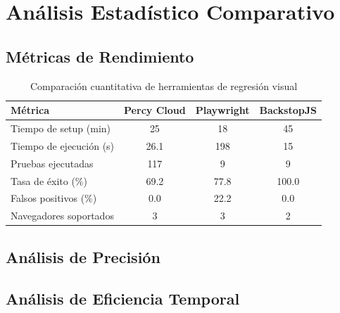 \documentclass{article}
\begin{document}
\section{Análisis Estadístico Comparativo}

\subsection{Métricas de Rendimiento}

\begin{table}[H]
\centering
\begin{tabular}{|l|c|c|c|}
\hline
\textbf{Métrica} & \textbf{Percy Cloud} & \textbf{Playwright} & \textbf{BackstopJS} \\
\hline
Tiempo de setup (min) & 25 & 18 & 45 \\
Tiempo de ejecución (s) & 26.1 & 198 & 15 \\
Pruebas ejecutadas & 117 & 9 & 9 \\
Tasa de éxito (\%) & 69.2 & 77.8 & 100.0 \\
Falsos positivos (\%) & 0.0 & 22.2 & 0.0 \\
Navegadores soportados & 3 & 3 & 2 \\
\hline
\end{tabular}
\caption{Comparación cuantitativa de herramientas de regresión visual}
\label{tab:metrics}
\end{table}

\subsection{Análisis de Precisión}


\subsection{Análisis de Eficiencia Temporal}
\end{document}
